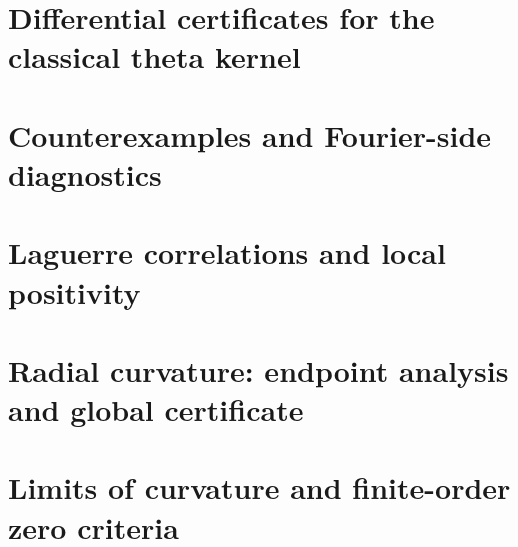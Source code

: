 \documentclass[11pt]{article}
\begin{document}
\begin{abstract}
we additionally prove the sharp inverse-time coefficient
$3/2$ and a nonintegrable comparison singularity;
this does not establish any collision for the Riemann theta flow.
A sharp one-sided inverse-square bound reduces shielding loss to weighted exterior-gap excesses. A separate endpoint audit shows that the proposed strict integrated signed-defect inequality is equivalent to endpoint gap positivity and would additionally require simple critical zeros. An exact four-root heat polynomial provides a collision control. A terminal closure lemma reduces the global RH target to real-rootedness at a sequence of positive heat times approaching zero. An explicit even scaled heat-polynomial family shows that generic time-renewal bounds cannot rule out arbitrarily high, short-time collisions. An independent all-height theta-flow envelope remains open. We do not prove RH or extend the known
finite-height verification frontier.
\end{abstract}
\let\MainSection\section
\let\section\subsection

\MainSection{Differential certificates for the classical theta kernel}


\MainSection{Counterexamples and Fourier-side diagnostics}



\MainSection{Laguerre correlations and local positivity}



\MainSection{Radial curvature: endpoint analysis and global certificate}




\MainSection{Limits of curvature and finite-order zero criteria}




















\end{document}
